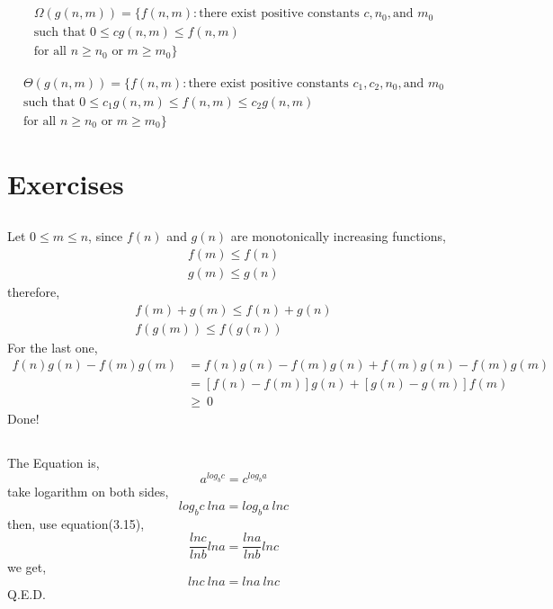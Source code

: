 \documentclass[paper=a4, fontsize=11pt,oneside]{book} %
\numberwithin{equation}{section} %
\numberwithin{figure}{section} %
\numberwithin{table}{section} %
\begin{document}
	\subsection{}
		\begin{align*}
		\Omega(g(n,m)) = \{ f(n, m) : \text{there exist positive constants } c, n_0, \text{and } m_0 \\ 
			\text{such that } 0 \leq cg(n, m) \leq f(n, m) \\
			\text{for all } n \geq n_0 \text{ or } m \geq m_0 \}
		\end{align*}
		
				\begin{align*}
				\Theta(g(n,m)) = \{ f(n, m) : \text{there exist positive constants } c_1, c_2, n_0, \text{and } m_0 \\ 
				\text{such that } 0 \leq c_1g(n, m) \leq f(n, m) \leq c_2g(n, m) \\
				\text{for all } n \geq n_0 \text{ or } m \geq m_0 \}
				\end{align*}
	\section{Exercises}
		\subsection{}
			Let $0 \leq m \leq n$, since $f(n)$ and $g(n)$ are monotonically increasing functions,
			\begin{align*}
			f(m) \leq f(n) \\
			g(m) \leq g(n) 
			\end{align*}
			therefore,
			\begin{align*}
			f(m) + g(m) \leq f(n) + g(n) \\
			f(g(m)) \leq f(g(n))
			\end{align*}
			For the last one,
			\begin{align*}
			f(n)g(n) - f(m)g(m)  & = f(n)g(n) - f(m)g(n) + f(m)g(n) - f(m)g(m) \\
			 & = [f(n) - f(m)]g(n) + [g(n) - g(m)]f(m) \\
			 & \geq \ 0
			\end{align*}
			Done!
		
		\subsection{}
			The Equation is,
			\begin{equation*}
			a^{log_bc} = c^{log_ba}
			\end{equation*}
			take logarithm on both sides,
			\begin{equation*}
			log_bc\ lna = log_ba\ lnc
			\end{equation*}
			then, use equation(3.15),
			\begin{equation*}
			\frac{lnc}{lnb} lna = \frac{lna}{lnb} lnc
			\end{equation*}
			we get,
			\begin{equation*}
			lnc\  lna = lna \ lnc
			\end{equation*}
			Q.E.D.
			
\end{document}
